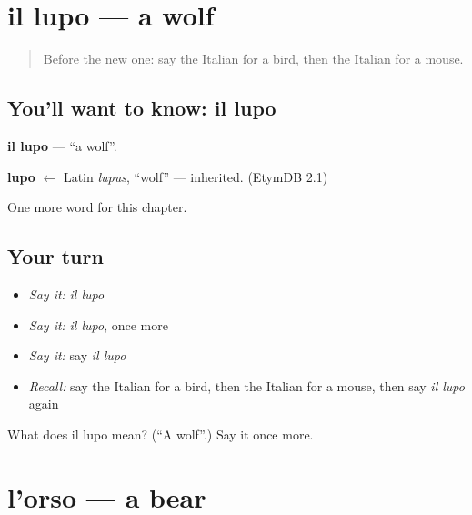 \section[il lupo]{il lupo — a wolf}

\label{lesson:IT-C69-lupo}



\begin{quote}
Before the new one: say the Italian for a bird, then the Italian for a mouse.
\end{quote}

\subsection*{You'll want to know: il lupo}
\textbf{il lupo} — \textquotedblleft{}a wolf\textquotedblright{}.

\begin{cousinweb}
\textbf{lupo} $\leftarrow$ Latin \emph{lupus}, \textquotedblleft{}wolf\textquotedblright{} — inherited. (EtymDB 2.1)
\end{cousinweb}

\begin{grammarlens}[title={What you've built}]
One more word for this chapter.
\end{grammarlens}

\subsection*{Your turn}
\begin{itemize}
\raggedright
  \item \emph{Say it:} \emph{il lupo}
  \item \emph{Say it:} \emph{il lupo}, once more
  \item \emph{Say it:} say \emph{il lupo}
  \item \emph{Recall:} say the Italian for a bird, then the Italian for a mouse, then say \emph{il lupo} again
\end{itemize}

\begin{tcolorbox}[breakable,colback=teal!4,colframe=teal!35!black,title={Before you move on}]
What does il lupo mean? (\textquotedblleft{}A wolf\textquotedblright{}.) Say it once more.
\end{tcolorbox}
\section[l'orso]{l'orso — a bear}

